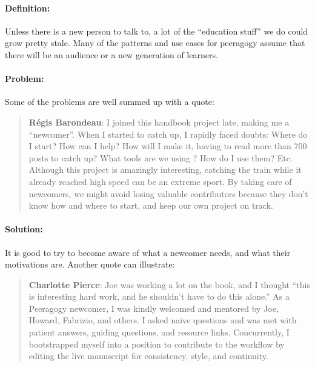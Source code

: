 
\paragraph{Definition:} Unless there is a new person to talk to, a lot of
the ``education stuff'' we do could grow pretty stale. Many of the
patterns and use cases for peeragogy assume that there will be an
audience or a new generation of learners.

\paragraph{Problem:} Some of the problems are well summed up with a quote:

\begin{quote}
\textbf{Régis Barondeau}: I joined this handbook project late, making me
a ``newcomer''. When I started to catch up, I rapidly faced doubts:
Where do I start? How can I help? How will I make it, having to read
more than 700 posts to catch up? What tools are we using ? How do I use
them? Etc. Although this project is amazingly interesting, catching the
train while it already reached high speed can be an extreme sport. By
taking care of newcomers, we might avoid losing valuable contributors
because they don't know how and where to start, and keep our own project
on track.
\end{quote}

\paragraph{Solution:} It is good to try to become aware of what a newcomer
needs, and what their motivations are. Another quote can illustrate:

\begin{quote}
\textbf{Charlotte Pierce}: Joe was working a lot on the book, and I
thought ``this is interesting hard work, and he shouldn't have to do
this alone.'' As a Peeragogy newcomer, I was kindly welcomed and
mentored by Joe, Howard, Fabrizio, and others. I asked naive questions
and was met with patient answers, guiding questions, and resource links.
Concurrently, I bootstrapped myself into a position to contribute to the
workflow by editing the live manuscript for consistency, style, and
continuity.
\end{quote}

